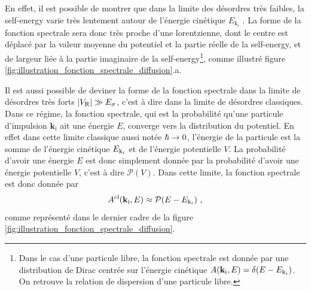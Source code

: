 En effet, il est possible de montrer que dans la limite des désordres très faibles, la self-energy varie très lentement autour de l'énergie cinétique $E_{\mathrm{k}_i}$ \citep{kuhn2007coherent}. La forme de la fonction spectrale sera donc très proche d'une lorentzienne, dont le centre est déplacé par la valeur moyenne du potentiel et la partie réelle de la self-energy, et de largeur liée à la partie imaginaire de la self-energy\footnote{Dans le cas d'une particule libre, la fonction spectrale est donnée par une distribution de Dirac centrée sur l'énergie cinétique $A(\mathbf{k}_{\mathrm{i}},E)=\delta(E-E_{\mathrm{k}_i})$. On retrouve la relation de dispersion d'une particule libre.}, comme illustré figure \ref{fig:illustration_fonction_spectrale_diffusion}.a. 


Il est aussi possible de deviner la forme de la fonction spectrale dans la limite de désordres très forts $|V_{\mathrm{R}}|\gg E_{\sigma}$, c'est à dire dans la limite de désordres classiques. Dans ce régime, la fonction spectrale, qui est la probabilité qu'une particule d'impulsion $\mathbf{k}_{\mathrm{i}}$ ait une énergie $E$, converge vers la distribution du potentiel. En effet dans cette limite classique aussi notée $\hslash\rightarrow 0$, l'énergie de la particule est la somme de l'énergie cinétique $E_{\mathrm{k}_i}$ et de l'énergie potentielle $V$. La probabilité d'avoir une énergie $E$ est donc simplement donnée par la probabilité d'avoir une énergie potentielle $V$, c'est à dire $\mathcal{P}(V)$. Dans cette limite, la fonction spectrale est donc donnée par \citep{trappe2015semiclassical}
\begin{equation}
A^{\mathrm{cl}}(\mathbf{k}_{\mathrm{i}},E)\approx \mathcal{P}(E-E_{\mathrm{k}_i}) \text{ ,}
\end{equation}
comme représenté dans le dernier cadre de la figure \ref{fig:illustration_fonction_spectrale_diffusion}. 


